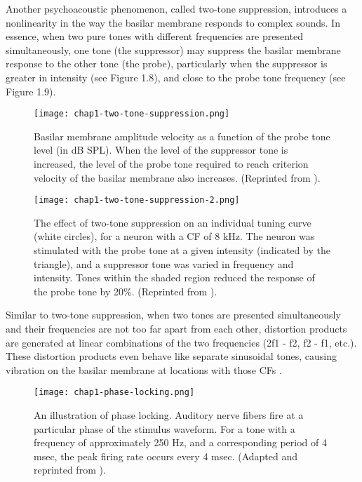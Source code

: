 Another psychoacoustic phenomenon, called two-tone suppression, introduces a nonlinearity in the way the basilar membrane responds to complex sounds.  In essence, when two pure tones with different frequencies are presented simultaneously, one tone (the suppressor) may suppress the basilar membrane response to the other tone (the probe), particularly when the suppressor is greater in intensity (see Figure 1.8), and close to the probe tone frequency (see Figure 1.9).

\begin{figure}[htbp]
\begin{center}
\texttt{[image: chap1-two-tone-suppression.png]} \\
\caption[Two-tone suppression - effects of intensity]{Basilar membrane amplitude velocity as a function of the probe tone level (in dB SPL).  When the level of the suppressor tone is increased, the level of the probe tone required to reach criterion velocity of the basilar membrane also increases.  (Reprinted from ).}
\label{two-tone-1}
\end{center}
\end{figure}

\begin{figure}[htbp]
\begin{center}
\texttt{[image: chap1-two-tone-suppression-2.png]} \\
\caption[Two-tone suppression - effects of frequency]{The effect of two-tone suppression on an individual tuning curve (white circles), for a neuron with a CF of 8 kHz.  The neuron was stimulated with the probe tone at a given intensity (indicated by the triangle), and a suppressor tone was varied in frequency and intensity.  Tones within the shaded region reduced the response of the probe tone by 20\%.  (Reprinted from ).}
\label{two-tone-2}
\end{center}
\end{figure}

Similar to two-tone suppression, when two tones are presented simultaneously and their frequencies are not too far apart from each other, distortion products are generated at linear combinations of the two frequencies (2f1 - f2, f2 - f1, etc.).  These distortion products even behave like separate sinusoidal tones, causing vibration on the basilar membrane at locations with those CFs \cite{Moore2007}.

\begin{figure}[ht]
\begin{center}
\texttt{[image: chap1-phase-locking.png]} \\
\caption[Phase locking]{An illustration of phase locking.  Auditory nerve fibers fire at a particular phase of the stimulus waveform.  For a tone with a frequency of approximately 250 Hz, and a corresponding period of 4 msec, the peak firing rate occurs every 4 msec.  (Adapted and reprinted from ).}
\label{phase-locking}
\end{center}
\end{figure}

